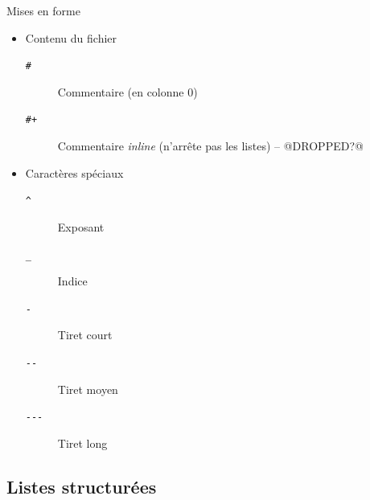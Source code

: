 \documentclass[presentation,t,hideothersubsections]{beamer}
\begin{document}
\begin{frame}[fragile,label=sec-2-5-3]{Mises en forme}
 \begin{itemize}
\item Contenu du fichier
\begin{description}
\item[\texttt{\#}] Commentaire (en colonne 0)
\item[\texttt{\#+}] Commentaire \emph{inline} (n'arrête pas les listes) -- @DROPPED?@
\end{description}

\item Caractères spéciaux
\begin{description}
\item[\texttt{\textasciicircum{}}] Exposant
\item[\texttt{\_}] Indice
\item[\texttt{-}] Tiret court
\item[\texttt{-{}-}] Tiret moyen
\item[\texttt{-{}-{}-}] Tiret long
\end{description}
\end{itemize}
\end{frame}
\subsection{Listes structurées}
\label{sec-2-6}
\end{document}
